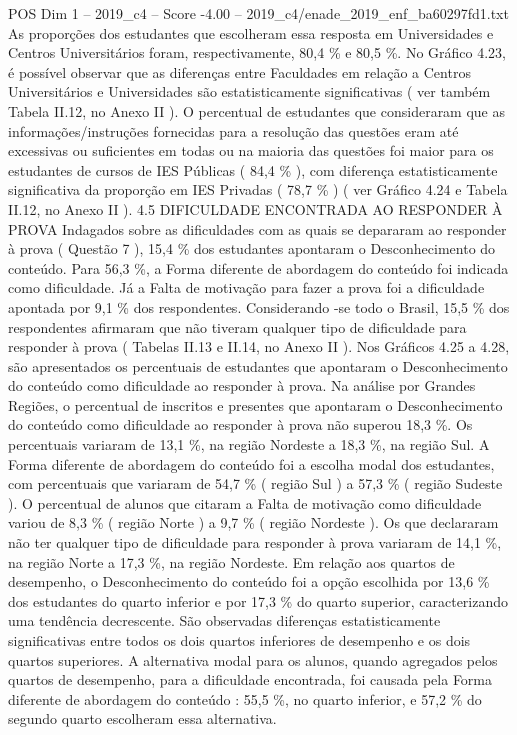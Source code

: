 \begin{textsample}{POS Dim 1 – 2019\_c4 – Score -4.00 – 2019\_c4/enade\_2019\_enf\_ba60297fd1.txt}
As proporções dos estudantes que escolheram essa resposta em Universidades e Centros Universitários foram, respectivamente, 80,4 \% e 80,5 \%.
No Gráfico 4.23, é possível observar que as diferenças entre Faculdades em relação a Centros Universitários e Universidades são estatisticamente significativas ( ver também Tabela II.12, no Anexo II ).
O percentual de estudantes que consideraram que as informações/instruções fornecidas para a resolução das questões eram até excessivas ou suficientes em todas ou na maioria das questões foi maior para os estudantes de cursos de IES Públicas ( 84,4 \% ), com diferença estatisticamente significativa da proporção em IES Privadas ( 78,7 \% ) ( ver Gráfico 4.24 e Tabela II.12, no Anexo II ). 4.5 DIFICULDADE ENCONTRADA AO RESPONDER À PROVA Indagados sobre as dificuldades com as quais se depararam ao responder à prova ( Questão 7 ), 15,4 \% dos estudantes apontaram o Desconhecimento do conteúdo.
Para 56,3 \%, a Forma diferente de abordagem do conteúdo foi indicada como dificuldade.
Já a Falta de motivação para fazer a prova foi a dificuldade apontada por 9,1 \% dos respondentes.
Considerando -se todo o Brasil, 15,5 \% dos respondentes afirmaram que não tiveram qualquer tipo de dificuldade para responder à prova ( Tabelas II.13 e II.14, no Anexo II ).
Nos Gráficos 4.25 a 4.28, são apresentados os percentuais de estudantes que apontaram o Desconhecimento do conteúdo como dificuldade ao responder à prova.
Na análise por Grandes Regiões, o percentual de inscritos e presentes que apontaram o Desconhecimento do conteúdo como dificuldade ao responder à prova não superou 18,3 \%.
Os percentuais variaram de 13,1 \%, na região Nordeste a 18,3 \%, na região Sul.
A Forma diferente de abordagem do conteúdo foi a escolha modal dos estudantes, com percentuais que variaram de 54,7 \% ( região Sul ) a 57,3 \% ( região Sudeste ).
O percentual de alunos que citaram a Falta de motivação como dificuldade variou de 8,3 \% ( região Norte ) a 9,7 \% ( região Nordeste ).
Os que declararam não ter qualquer tipo de dificuldade para responder à prova variaram de 14,1 \%, na região Norte a 17,3 \%, na região Nordeste.
Em relação aos quartos de desempenho, o Desconhecimento do conteúdo foi a opção escolhida por 13,6 \% dos estudantes do quarto inferior e por 17,3 \% do quarto superior, caracterizando uma tendência decrescente.
São observadas diferenças estatisticamente significativas entre todos os dois quartos inferiores de desempenho e os dois quartos superiores.
A alternativa modal para os alunos, quando agregados pelos quartos de desempenho, para a dificuldade encontrada, foi causada pela Forma diferente de abordagem do conteúdo : 55,5 \%, no quarto inferior, e 57,2 \% do segundo quarto escolheram essa alternativa.

\end{textsample}

